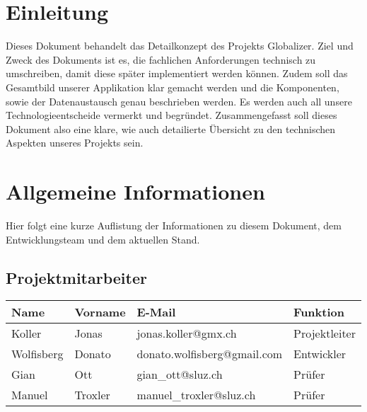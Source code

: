 


	

	\begin{center}
	\end{center}

	\section{Einleitung}
	Dieses Dokument behandelt das Detailkonzept des Projekts Globalizer. Ziel und Zweck des Dokuments ist es, die fachlichen Anforderungen technisch zu umschreiben, damit diese später implementiert werden können. Zudem soll das Gesamtbild unserer Applikation klar gemacht werden und die Komponenten, sowie der Datenaustausch genau beschrieben werden. Es werden auch all unsere Technologieentscheide vermerkt und begründet. Zusammengefasst soll dieses Dokument also eine klare, wie auch detailierte Übersicht zu den technischen Aspekten unseres Projekts sein.

	\newpage

	\section{Allgemeine Informationen}
	Hier folgt eine kurze Auflistung der Informationen zu diesem Dokument, dem Ent\-wicklungsteam und dem aktuellen Stand.

	\subsection{Projektmitarbeiter}
	\begin{table}[h]
		\begin{tabularx}{\textwidth}{|l|l|X|l|}
			\hline
			\textbf{Name} & \textbf{Vorname}  & \textbf{E-Mail}                & \textbf{Funktion}     \\ \hline
			Koller        & Jonas             & jonas.koller@gmx.ch            & Projektleiter         \\ \hline
			Wolfisberg    & Donato            & donato.wolfisberg@gmail.com    & Entwickler            \\ \hline
			Gian          & Ott               & gian\_ott@sluz.ch              & Prüfer                \\ \hline
			Manuel        & Troxler           & manuel\_troxler@sluz.ch        & Prüfer                \\ \hline
		\end{tabularx}%
	\end{table}

